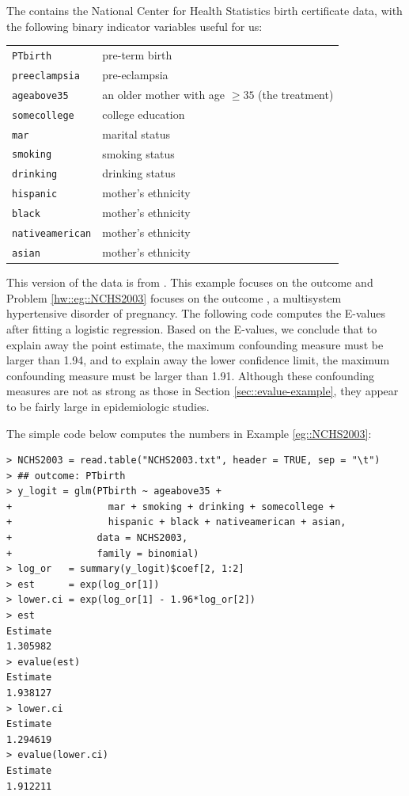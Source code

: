 \begin{example}
\label{eg::NCHS2003}
The  contains the National Center for Health Statistics birth certificate data, with the following binary indicator variables useful for us:


 

\begin{tabular}{ll}
\hline 
\texttt{PTbirth} &
 pre-term birth \\
\texttt{preeclampsia} &
 pre-eclampsia \\
\texttt{ageabove35}& 
 an older mother with age $\geq 35$ (the treatment) \\
\texttt{somecollege}&
 college education \\
\texttt{mar}& 
 marital status \\
\texttt{smoking}& 
 smoking status \\
\texttt{drinking}& 
 drinking status \\
\texttt{hispanic}& 
 mother's ethnicity  \\
\texttt{black}& 
 mother's ethnicity  \\
\texttt{nativeamerican}& 
 mother's ethnicity \\
\texttt{asian}& 
 mother's ethnicity\\
 \hline 
\end{tabular} 



This version of the data is from \citet{valeri2014estimation}. This example focuses on the outcome  and Problem \ref{hw::eg::NCHS2003} focuses on the outcome , a multisystem hypertensive disorder of pregnancy. The following  code computes the E-values after fitting a logistic regression. Based on the E-values, we conclude that to explain away the point estimate, the maximum confounding measure must be larger than 1.94, and to explain away the lower confidence limit, the maximum confounding measure must be larger than 1.91. Although these confounding measures are not as strong as those in Section \ref{sec::evalue-example}, they appear to be fairly large in epidemiologic studies. 
\end{example}


The simple  code below computes the numbers in Example \ref{eg::NCHS2003}: 
 \begin{lstlisting}
> NCHS2003 = read.table("NCHS2003.txt", header = TRUE, sep = "\t")
> ## outcome: PTbirth
> y_logit = glm(PTbirth ~ ageabove35 + 
+                 mar + smoking + drinking + somecollege + 
+                 hispanic + black + nativeamerican + asian,
+               data = NCHS2003, 
+               family = binomial)
> log_or   = summary(y_logit)$coef[2, 1:2]
> est      = exp(log_or[1])
> lower.ci = exp(log_or[1] - 1.96*log_or[2])
> est
Estimate 
1.305982 
> evalue(est)
Estimate 
1.938127 
> lower.ci
Estimate 
1.294619 
> evalue(lower.ci)
Estimate 
1.912211 
\end{lstlisting}


